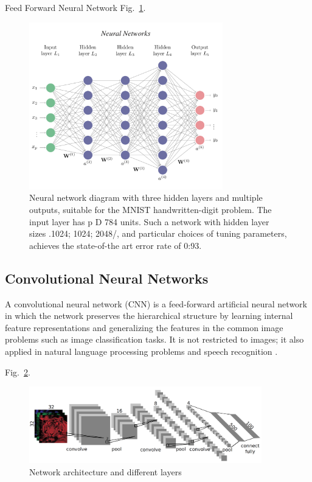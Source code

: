 Feed Forward Neural Network Fig.~\ref{fig:multi-layer}.
\begin{figure}[htbp]
\centering
\includegraphics[width=0.75\textwidth]{images/NN.png}
\caption{Neural network diagram with three hidden layers and multiple outputs, suitable for the MNIST handwritten-digit problem. The input layer has p D 784 units. Such a network with hidden layer sizes .1024; 1024; 2048/, and particular choices of tuning parameters, achieves the state-of-the art error rate of 0:93.}
\label{fig:multi-layer}
\end{figure}

\clearpage

\subsection{Convolutional Neural Networks}
A convolutional neural network (CNN) is a feed-forward artificial neural network in which the network preserves the hierarchical structure by learning internal feature representations and generalizing the features in the common image problems such as image classification tasks. It is not restricted to images; it also applied in natural language processing problems and speech recognition \cite{Manaswi2018}.

Fig.~\ref{fig:CNN-1}.
\begin{figure}[htbp]
\centering
\includegraphics[width=0.90\textwidth]{images/cnn-arch-1.png}
\caption{Network architecture and different layers}
\label{fig:CNN-1}
\end{figure}

